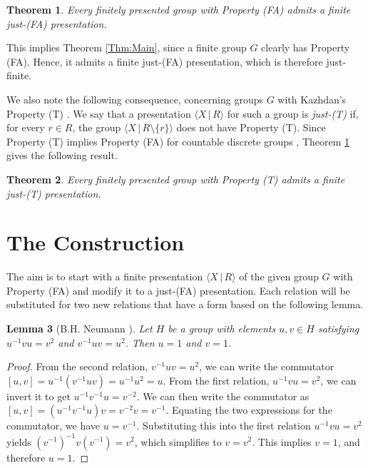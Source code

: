 \documentclass[11pt,oneside]{amsart}
\newtheorem{theorem}{Theorem}
\newtheorem{lemma}[theorem]{Lemma}
\begin{document}
\begin{theorem}
\label{Thm:JustFA}
Every finitely presented group with Property (FA) admits a finite just-(FA) presentation.
\end{theorem}

This implies Theorem \ref{Thm:Main}, since a finite group $G$ clearly has Property (FA). Hence, it admits a finite just-(FA) presentation, which is therefore just-finite.

We also note the following consequence, concerning groups $G$ with Kazhdan's Property (T) \cite{Kazhdan}. We say that a presentation $\langle X \, | \, R \rangle$ for such a group is \emph{just-(T)} if, for every $r \in R$, the group $\langle X \, | \, R \setminus \{r\} \rangle$ does not have Property (T). Since Property (T) implies Property (FA) for countable discrete groups \cite{Watatani}, Theorem \ref{Thm:JustFA} gives the following result.

\begin{theorem}
\label{Thm:JustT}
Every finitely presented group with Property (T) admits a finite just-(T) presentation.
\end{theorem}


\section{The Construction}

The aim is to start with a finite presentation $\langle X \, | \, R \rangle$ of the given group $G$ with Property (FA) and modify it to a just-(FA) presentation. Each relation will be substituted for two new relations that have a form based on the following lemma.

\begin{lemma}[B.H. Neumann \cite{Neumann}]
\label{lem:neumann}
Let $H$ be a group with elements $u, v \in H$ satisfying $u^{-1}vu = v^2$ and $v^{-1}uv = u^2$. Then $u=1$ and $v=1$.
\end{lemma}

\begin{proof}
From the second relation, $v^{-1}uv = u^2$, we can write the commutator $[u, v] = u^{-1}(v^{-1}uv) =
u^{-1}u^2 = u$. From the first relation, $u^{-1}vu = v^2$, we can invert it to get $u^{-1}v^{-1}u =
v^{-2}$. We can then write the commutator as $[u, v] = (u^{-1}v^{-1}u)v = v^{-2}v = v^{-1}$. Equating
the two expressions for the commutator, we have $u = v^{-1}$. Substituting this into the first relation
$u^{-1}vu = v^2$ yields $(v^{-1})^{-1}v(v^{-1}) = v^2$, which simplifies to $v = v^2$. This implies $v = 1$, and therefore
$u = 1$.
\end{proof}
\end{document}
